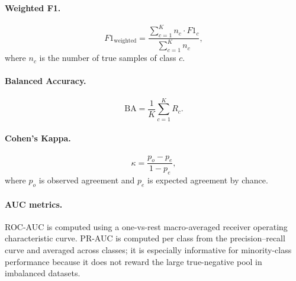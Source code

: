 \paragraph{Weighted F1.}
\begin{equation}
F1_{\mathrm{weighted}} =
\frac{\sum_{c=1}^{K} n_c \cdot F1_c}{\sum_{c=1}^{K} n_c},
\end{equation}
where \(n_c\) is the number of true samples of class \(c\).

\paragraph{Balanced Accuracy.}
\begin{equation}
\mathrm{BA} = \frac{1}{K} \sum_{c=1}^{K} R_c .
\end{equation}

\paragraph{Cohen's Kappa.}
\begin{equation}
\kappa = \frac{p_o - p_e}{1 - p_e},
\end{equation}
where \(p_o\) is observed agreement and \(p_e\) is expected agreement by
chance.

\paragraph{AUC metrics.}
ROC-AUC is computed using a one-vs-rest macro-averaged receiver operating
characteristic curve. PR-AUC is computed per class from the
precision--recall curve and averaged across classes; it is especially
informative for minority-class performance because it does not reward the
large true-negative pool in imbalanced datasets.
